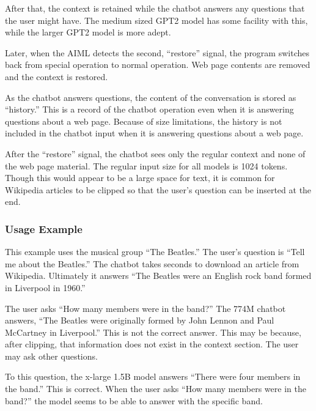 After that, the context is retained while the chatbot answers any questions that the user might have. The medium sized GPT2 model has some facility with this, while the larger GPT2 model is more adept.

Later, when the AIML detects the second, ``restore'' signal, the program switches back from special operation to normal operation. Web page contents are removed and the context is restored. %

As the chatbot answers questions, the content of the conversation is stored as ``history.'' %
This is a record of the chatbot operation even when it is answering questions about a web page. %
Because of size limitations, the history is not included in the chatbot input when it is answering questions about a web page. %

After the ``restore'' signal, the chatbot sees only the regular context and none of the web page material. The regular input size for all models is 1024 tokens. %
Though this would appear to be a large space for text, it is common for Wikipedia articles to be clipped so that the user's question can be inserted at the end.

\subsubsection{Usage Example}

This example uses the musical group ``The Beatles.'' The user's question is ``Tell me about the Beatles.'' The chatbot takes seconds to download an article from Wikipedia. Ultimately it answers ``The Beatles were an English rock band formed in Liverpool in 1960.''

The user asks ``How many members were in the band?'' The 774M chatbot answers, ``The Beatles were originally formed by John Lennon and Paul McCartney in Liverpool.'' This is not the correct answer. This may be because, after clipping, that information does not exist in the context section. The user may ask other questions. %

To this question, the x-large 1.5B model answers ``There were four members in the band.'' This is correct. When the user asks ``How many members were in the band?'' the model seems to be able to answer with the specific band. %

